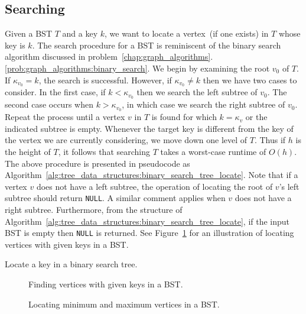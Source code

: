 \subsection{Searching}

Given a BST $T$ and a key $k$, we want to locate a vertex~(if one
exists) in $T$ whose key is $k$. The search procedure for a BST is
reminiscent of the binary search algorithm
discussed in
problem~\ref{chap:graph_algorithms}.\ref{prob:graph_algorithms:binary_search}.
We begin by examining the root $v_0$ of $T$. If $\kappa_{v_0} = k$,
the search is successful. However, if $\kappa_{v_0} \neq k$ then we
have two cases to consider. In the first case, if $k < \kappa_{v_0}$
then we search the left subtree of $v_0$. The second case occurs when
$k > \kappa_{v_0}$, in which case we search the right subtree of
$v_0$. Repeat the process until a vertex $v$ in $T$ is found for which
$k = \kappa_v$ or the indicated subtree is empty. Whenever the target
key is different from the key of the vertex we are currently
considering, we move down one level of $T$. Thus if $h$ is the height
of $T$, it follows that searching $T$ takes a worst-case runtime of
$O(h)$. The above procedure is presented in pseudocode as
Algorithm~\ref{alg:tree_data_structures:binary_search_tree_locate}. Note
that if a vertex $v$ does not have a left subtree, the operation of
locating the root of $v$'s left subtree should return \texttt{NULL}. A
similar comment applies when $v$ does not have a right
subtree. Furthermore, from the structure of
Algorithm~\ref{alg:tree_data_structures:binary_search_tree_locate}, if
the input BST is empty then \texttt{NULL} is returned. See
Figure~\ref{fig:tree_data_structures:binary_search_tree_search} for an
illustration of locating vertices with given keys in a BST.

\begin{algorithm}[!htbp]

\caption{Locate a key in a binary search tree.}
\label{alg:tree_data_structures:binary_search_tree_locate}
\end{algorithm}

\begin{figure}[!htbp]
\centering

\caption{Finding vertices with given keys in a BST.}
\label{fig:tree_data_structures:binary_search_tree_search}
\end{figure}

\begin{figure}[!htbp]
\centering

\caption{Locating minimum and maximum vertices in a BST.}
\label{fig:tree_data_structures:binary_search_tree_minimum_maximum}
\end{figure}

